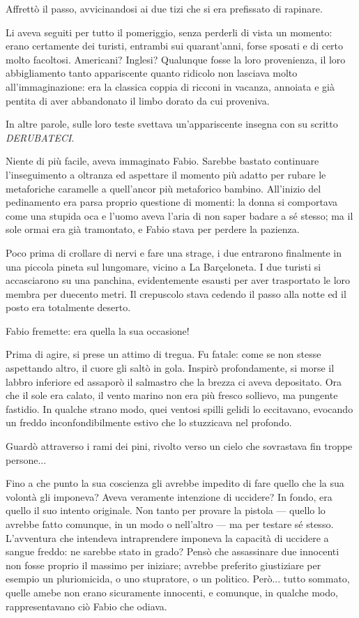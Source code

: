 Affrettò il passo, avvicinandosi ai due tizi che si era prefissato di rapinare.

Li aveva seguiti per tutto il pomeriggio, senza perderli di vista un momento: erano certamente dei turisti, entrambi sui quarant'anni, forse sposati e di certo molto facoltosi. Americani? Inglesi? Qualunque fosse la loro provenienza, il loro abbigliamento tanto appariscente quanto ridicolo non lasciava molto all'immaginazione: era la classica coppia di ricconi in vacanza, annoiata e già pentita di aver abbandonato il limbo dorato da cui proveniva.

In altre parole, sulle loro teste svettava un'appariscente insegna con su scritto \emph{DERUBATECI}.

Niente di più facile, aveva immaginato Fabio. Sarebbe bastato continuare l'inseguimento a oltranza ed aspettare il momento più adatto per rubare le metaforiche caramelle a quell'ancor più metaforico bambino. All'inizio del pedinamento era parsa proprio questione di momenti: la donna si comportava come una stupida oca e l'uomo aveva l'aria di non saper badare a sé stesso; ma il sole ormai era già tramontato, e Fabio stava per perdere la pazienza.

Poco prima di crollare di nervi e fare una strage, i due entrarono finalmente in una piccola pineta sul lungomare, vicino a La Barçeloneta. I due turisti si accasciarono su una panchina, evidentemente esausti per aver trasportato le loro membra per duecento metri. Il crepuscolo stava cedendo il passo alla notte ed il posto era totalmente deserto.

Fabio fremette: era quella la sua occasione!

Prima di agire, si prese un attimo di tregua. Fu fatale: come se non stesse aspettando altro, il cuore gli saltò in gola. Inspirò profondamente, si morse il labbro inferiore ed assaporò il salmastro che la brezza ci aveva depositato. Ora che il sole era calato, il vento marino non era più fresco sollievo, ma pungente fastidio. In qualche strano modo, quei ventosi spilli gelidi lo eccitavano, evocando un freddo inconfondibilmente estivo che lo stuzzicava nel profondo.

Guardò attraverso i rami dei pini, rivolto verso un cielo che sovrastava fin troppe persone...

Fino a che punto la sua coscienza gli avrebbe impedito di fare quello che la sua volontà gli imponeva? Aveva veramente intenzione di uccidere? In fondo, era quello il suo intento originale. Non tanto per provare la pistola --- quello lo avrebbe fatto comunque, in un modo o nell'altro --- ma per testare sé stesso. L'avventura che intendeva intraprendere imponeva la capacità di uccidere a sangue freddo: ne sarebbe stato in grado? Pensò che assassinare due innocenti non fosse proprio il massimo per iniziare; avrebbe preferito giustiziare per esempio un pluriomicida, o uno stupratore, o un politico. Però... tutto sommato, quelle amebe non erano sicuramente innocenti, e comunque, in qualche modo, rappresentavano ciò Fabio che odiava.

